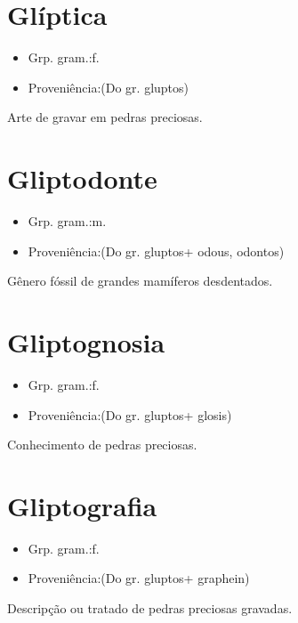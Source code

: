 \section{Glíptica}
\begin{itemize}
\item {Grp. gram.:f.}
\end{itemize}
\begin{itemize}
\item {Proveniência:(Do gr. \textunderscore gluptos\textunderscore )}
\end{itemize}
Arte de gravar em pedras preciosas.
\section{Gliptodonte}
\begin{itemize}
\item {Grp. gram.:m.}
\end{itemize}
\begin{itemize}
\item {Proveniência:(Do gr. \textunderscore gluptos\textunderscore  + \textunderscore odous\textunderscore , \textunderscore odontos\textunderscore )}
\end{itemize}
Gênero fóssil de grandes mamíferos desdentados.
\section{Gliptognosia}
\begin{itemize}
\item {Grp. gram.:f.}
\end{itemize}
\begin{itemize}
\item {Proveniência:(Do gr. \textunderscore gluptos\textunderscore  + \textunderscore glosis\textunderscore )}
\end{itemize}
Conhecimento de pedras preciosas.
\section{Gliptografia}
\begin{itemize}
\item {Grp. gram.:f.}
\end{itemize}
\begin{itemize}
\item {Proveniência:(Do gr. \textunderscore gluptos\textunderscore  + \textunderscore graphein\textunderscore )}
\end{itemize}
Descripção ou tratado de pedras preciosas gravadas.

